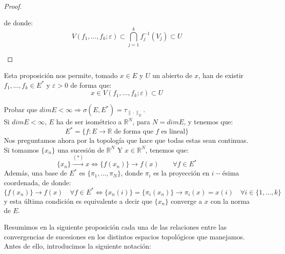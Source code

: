 \begin{prop}
\begin{proof}
\begin{enumerate}
                de donde:
                \begin{equation*}
                    V(f_1, \ldots, f_k;\varepsilon) \subset \bigcap_{j = 1}^k f_j^{-1}(V_j) \subset U
                \end{equation*}
        \end{enumerate}
    \end{proof}
\end{prop}

\noindent
Esta proposición nos permite, tomado $x\in E$ y $U$ un abierto de $x$, han de existir $f_1, \ldots, f_k\in E^\ast$ y $\varepsilon>0$ de forma que:
\begin{equation*}
    x\in V(f_1, \ldots, f_k;\varepsilon)\subset U
\end{equation*}

\begin{ejercicio} %
    Probar que $dim E < \infty \Longrightarrow \sigma(E,E^\ast) = \tau_{\|\cdot \|_E}$.\\

    \noindent
    Si $dim E < \infty$, $E$ ha de ser isométrico a $\mathbb{R}^N$, para $N = dim E$, y tenemos que:
    \begin{equation*}
        E^\ast = \{f:E\to \mathbb{R} \text{\ de forma que\ } f \text{\ es lineal}\}
    \end{equation*}
    Nos preguntamos ahora por la topología que hace que todas estas sean continuas. Si tomamos $\{x_n\}$ una sucesión de $\mathbb{R}^N$ Y $x\in \mathbb{R}^N$, tenemos que:
    \begin{equation*}
        \{x_n\} \stackrel{(\ast)}{\to} x \Longleftrightarrow \{f(x_n)\} \to f(x) \qquad \forall f\in E^\ast
    \end{equation*}
    Además, una base de $E^\ast$ es $\{\pi_1, \ldots, \pi_N\}$, donde $\pi_i$ es la proyección en $i-$ésima coordenada, de donde:
    \begin{equation*}
        \{f(x_n)\} \to f(x) \quad \forall f\in E^\ast \Longleftrightarrow \{x_n(i)\} =  \{\pi_i(x_n)\} \to \pi_i(x) = x(i) \quad \forall i \in \{1,\ldots, k\}
    \end{equation*}
    y esta última condición es equivalente a decir que $\{x_n\}$ converge a $x$ con la norma de $E$.
\end{ejercicio}

\noindent
Resumimos en la siguiente proposición cada una de las relaciones entre las convergencias de sucesiones en los distintos espacios topológicos que manejamos. Antes de ello, introducimos la siguiente notación:

